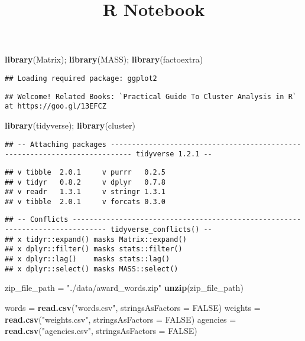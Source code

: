 \documentclass[]{article}
\title{R Notebook}
\author{}
\date{}
\newenvironment{Shaded}{\begin{snugshade}}{\end{snugshade}}
\newcommand{\DataTypeTok}[1]{\textcolor[rgb]{0.13,0.29,0.53}{#1}}
\newcommand{\KeywordTok}[1]{\textcolor[rgb]{0.13,0.29,0.53}{\textbf{#1}}}
\newcommand{\NormalTok}[1]{#1}
\newcommand{\OtherTok}[1]{\textcolor[rgb]{0.56,0.35,0.01}{#1}}
\newcommand{\StringTok}[1]{\textcolor[rgb]{0.31,0.60,0.02}{#1}}
\begin{document}
\maketitle

\begin{Shaded}
\begin{Highlighting}[]
\KeywordTok{library}\NormalTok{(Matrix); }\KeywordTok{library}\NormalTok{(MASS); }\KeywordTok{library}\NormalTok{(factoextra)}
\end{Highlighting}
\end{Shaded}

\begin{verbatim}
## Loading required package: ggplot2
\end{verbatim}

\begin{verbatim}
## Welcome! Related Books: `Practical Guide To Cluster Analysis in R` at https://goo.gl/13EFCZ
\end{verbatim}

\begin{Shaded}
\begin{Highlighting}[]
\KeywordTok{library}\NormalTok{(tidyverse); }\KeywordTok{library}\NormalTok{(cluster)}
\end{Highlighting}
\end{Shaded}

\begin{verbatim}
## -- Attaching packages --------------------------------------------------------------------------- tidyverse 1.2.1 --
\end{verbatim}

\begin{verbatim}
## v tibble  2.0.1     v purrr   0.2.5
## v tidyr   0.8.2     v dplyr   0.7.8
## v readr   1.3.1     v stringr 1.3.1
## v tibble  2.0.1     v forcats 0.3.0
\end{verbatim}

\begin{verbatim}
## -- Conflicts ------------------------------------------------------------------------------ tidyverse_conflicts() --
## x tidyr::expand() masks Matrix::expand()
## x dplyr::filter() masks stats::filter()
## x dplyr::lag()    masks stats::lag()
## x dplyr::select() masks MASS::select()
\end{verbatim}

\begin{Shaded}
\begin{Highlighting}[]
\NormalTok{zip_file_path =}\StringTok{ "./data/award_words.zip"}
\KeywordTok{unzip}\NormalTok{(zip_file_path)}

\NormalTok{words =}\StringTok{ }\KeywordTok{read.csv}\NormalTok{(}\StringTok{"words.csv"}\NormalTok{, }\DataTypeTok{stringsAsFactors =} \OtherTok{FALSE}\NormalTok{)}
\NormalTok{weights =}\StringTok{ }\KeywordTok{read.csv}\NormalTok{(}\StringTok{"weights.csv"}\NormalTok{, }\DataTypeTok{stringsAsFactors =} \OtherTok{FALSE}\NormalTok{)}
\NormalTok{agencies =}\StringTok{ }\KeywordTok{read.csv}\NormalTok{(}\StringTok{"agencies.csv"}\NormalTok{, }\DataTypeTok{stringsAsFactors =} \OtherTok{FALSE}\NormalTok{)}
\end{Highlighting}
\end{Shaded}
\end{document}
